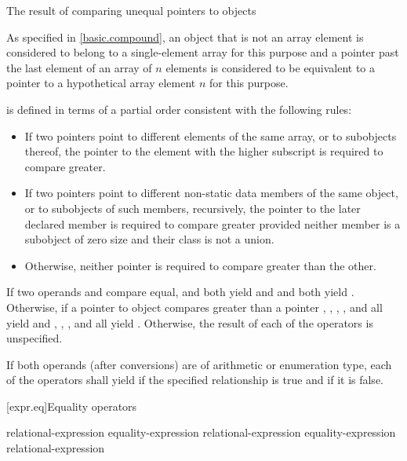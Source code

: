 \pnum
The result of comparing unequal pointers to objects
\begin{footnote}
As specified in \ref{basic.compound},
an object that is not an array element
is considered to belong to a
single-element array for this purpose and
a pointer past the last element of an array of $n$ elements
is considered to be equivalent to a pointer to a hypothetical array element
$n$ for this purpose.
\end{footnote}
is defined in terms of a partial order consistent with the following rules:
\begin{itemize}
\item If two pointers point to different elements of the same array, or to
subobjects thereof, the pointer to the element with the higher subscript
is required to compare greater.

\item If two pointers point to different non-static data members of the same
object, or to subobjects of such members, recursively,
the pointer to the later declared member is required to compare greater provided
neither member is a subobject of zero size
and their class is not a union.

\item Otherwise, neither pointer is required to compare greater than the other.
\end{itemize}

\pnum
If two operands  and  compare equal,
 and  both yield  and  and
 both yield . Otherwise, if a pointer to object 
compares greater than a pointer , , ,
, and  all yield  and ,
, , and  all yield .
Otherwise, the result of each of the operators is unspecified.

\pnum
If both operands (after conversions) are of arithmetic or enumeration type, each
of the operators shall yield  if the specified relationship is true
and  if it is false.

[expr.eq]{Equality operators}%
%
%

\begin{bnf}
\br
    relational-expression\br
    equality-expression \terminal{==} relational-expression\br
    equality-expression \terminal{!=} relational-expression
\end{bnf}

